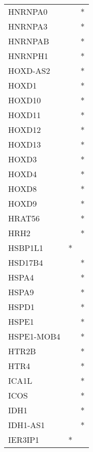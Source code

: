 \begin{longtable}{lcc}
HNRNPA0         &                &          * \\
HNRNPA3         &                &          * \\
HNRNPAB         &                &          * \\
HNRNPH1         &                &          * \\
HOXD-AS2        &                &          * \\
HOXD1           &                &          * \\
HOXD10          &                &          * \\
HOXD11          &                &          * \\
HOXD12          &                &          * \\
HOXD13          &                &          * \\
HOXD3           &                &          * \\
HOXD4           &                &          * \\
HOXD8           &                &          * \\
HOXD9           &                &          * \\
HRAT56          &                &          * \\
HRH2            &                &          * \\
HSBP1L1         &              * &            \\
HSD17B4         &                &          * \\
HSPA4           &                &          * \\
HSPA9           &                &          * \\
HSPD1           &                &          * \\
HSPE1           &                &          * \\
HSPE1-MOB4      &                &          * \\
HTR2B           &                &          * \\
HTR4            &                &          * \\
ICA1L           &                &          * \\
ICOS            &                &          * \\
IDH1            &                &          * \\
IDH1-AS1        &                &          * \\
IER3IP1         &              * &            \\

\end{longtable}
